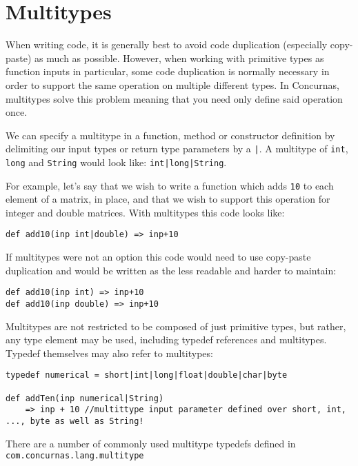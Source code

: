 \documentclass[conc-doc]{subfiles}
\begin{document}
	
	\chapter[Multitypes]{Multitypes}
	
When writing code, it is generally best to avoid code duplication (especially copy-paste) as much as possible. However, when working with primitive types as function inputs in particular, some code duplication is normally necessary in order to support the same operation on multiple different types. In Concurnas, multitypes solve this problem meaning that you need only define said operation once.

We can specify a multitype in a function, method or constructor definition by delimiting our input types or return type parameters by a \lstinline{|}. A multitype of \lstinline{int}, \lstinline{long} and \lstinline{String} would look like: \lstinline{int|long|String}.

For example, let’s say that we wish to write a function which adds \lstinline{10} to each element of a matrix, in place, and that we wish to support this operation for integer and double matrices. With multitypes this code looks like:
\begin{lstlisting}
def add10(inp int|double) => inp+10
\end{lstlisting}

If multitypes were not an option this code would need to  use copy-paste duplication and would be written as the less readable and harder to maintain:
\begin{lstlisting}
def add10(inp int) => inp+10
def add10(inp double) => inp+10
\end{lstlisting}

Multitypes are not restricted to be composed of just primitive types, but rather, any type element may be used, including typedef references and multitypes. Typedef themselves may also refer to multitypes:
\begin{lstlisting}
typedef numerical = short|int|long|float|double|char|byte

def addTen(inp numerical|String) 
	=> inp + 10 //multittype input parameter defined over short, int, ..., byte as well as String!
\end{lstlisting}

\begin{sloppypar}
There are a number of commonly used multitype typedefs defined in \lstinline{com.concurnas.lang.multitype}
\end{sloppypar}
\end{document}
